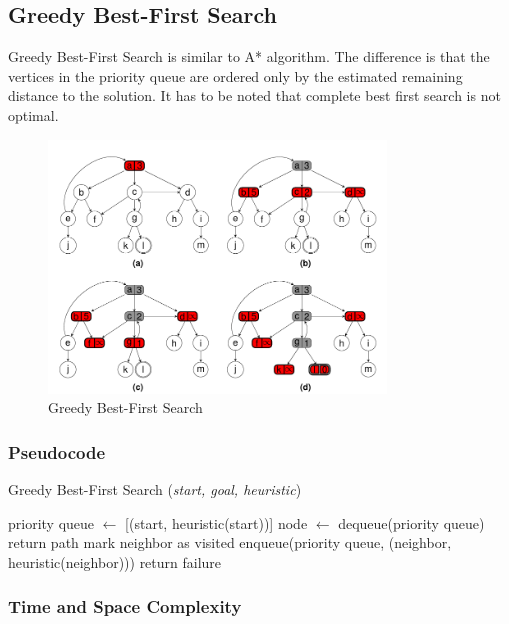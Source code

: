 \subsection{Greedy Best-First Search}
\noindent Greedy Best-First Search is similar to A* algorithm. The difference is that the vertices in the priority queue are ordered only by the estimated remaining distance to the solution. It has to be noted that complete best first search is not optimal.

\begin{figure}
	\centering
	\includegraphics[width=0.8\textwidth]{./imgs/gbfs.png}
	\caption{Greedy Best-First Search}
	\label{fig:GBFS}
\end{figure}

\subsubsection{Pseudocode}
\begin{algorithm}[H]
	\caption{Greedy Best-First Search (\textit{start, goal, heuristic})}
	\label{alg:gbfs}
	\begin{algorithmic}[1]
	\State priority queue \(\gets\) [(start, heuristic(start))]
		\State node \(\gets\) dequeue(priority queue)
			\State return path
		\EndIf
				\State mark neighbor as visited
				\State enqueue(priority queue, (neighbor, heuristic(neighbor)))
			\EndIf
		\EndFor
	\EndWhile
	\State return failure
	\end{algorithmic}
\end{algorithm}

\subsubsection{Time and Space Complexity}
